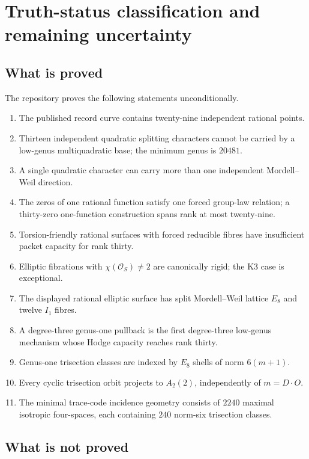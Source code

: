 \section{Truth-status classification and remaining uncertainty}

\subsection{What is proved}

The repository proves the following statements unconditionally.

\begin{enumerate}[leftmargin=*]
\item The published record curve contains twenty-nine independent rational points.
\item Thirteen independent quadratic splitting characters cannot be carried by a low-genus multiquadratic base; the minimum genus is $20481$.
\item A single quadratic character can carry more than one independent Mordell--Weil direction.
\item The zeros of one rational function satisfy one forced group-law relation; a thirty-zero one-function construction spans rank at most twenty-nine.
\item Torsion-friendly rational surfaces with forced reducible fibres have insufficient packet capacity for rank thirty.
\item Elliptic fibrations with $\chi(\mathcal O_S)\ne2$ are canonically rigid; the K3 case is exceptional.
\item The displayed rational elliptic surface has split Mordell--Weil lattice $E_8$ and twelve $I_1$ fibres.
\item A degree-three genus-one pullback is the first degree-three low-genus mechanism whose Hodge capacity reaches rank thirty.
\item Genus-one trisection classes are indexed by $E_8$ shells of norm $6(m+1)$.
\item Every cyclic trisection orbit projects to $A_2(2)$, independently of $m=D\cdot O$.
\item The minimal trace-code incidence geometry consists of $2240$ maximal isotropic four-spaces, each containing $240$ norm-six trisection classes.
\end{enumerate}

\subsection{What is not proved}

